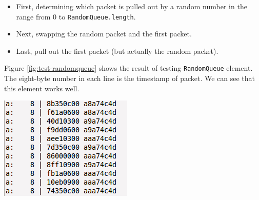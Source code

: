 \documentclass[a4paper]{article}
\begin{document}
  \begin{itemize}
  	\item First, determining which packet is pulled out by a random number in the range from $0$ to \texttt{RandomQueue.length}.
  	\item Next, swapping the random packet and the first packet.
  	\item Last, pull out the first packet (but actually the random packet).
  \end{itemize}
  Figure \ref{fig:test-randomqueue} shows the result of testing \texttt{RandomQueue} element. The eight-byte number in each line is the timestamp of packet. We can see that this element works well.
  \begin{center}
	\includegraphics[scale=0.70]{test-randomqueue.png}
	\label{fig:test-randomqueue}
  \end{center}
\end{document}
